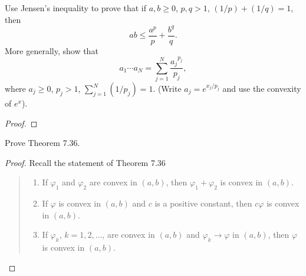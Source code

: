 \begin{problem}
Use Jensen's inequality to prove that if $a,b\geq 0$, $p,q>1$,
$(1/p)+(1/q)=1$, then
\[
ab\leq\frac{a^p}{p}+\frac{b^q}{q}.
\]
More generally, show that
\[
a_1\dotsm a_N=\sum_{j=1}^N\frac{{a_j}^{p_j}}{p_j},
\]
where $a_j\geq 0$, $p_j>1$, $\sum_{j=1}^N(1/p_j)=1$. (Write
$a_j=e^{x_j/p_j}$ and use the convexity of $e^x$).
\end{problem}
\begin{proof}
\end{proof}

\begin{problem}
Prove Theorem 7.36.
\end{problem}
\begin{proof}
Recall the statement of Theorem 7.36
\begin{quote}
\begin{enumerate}[label=\textnormal{(\roman*)},noitemsep]
\item If $\varphi_1$ and $\varphi_2$ are convex in $(a,b)$, then
  $\varphi_1+\varphi_2$ is convex in $(a,b)$.
\item If $\varphi$ is convex in $(a,b)$ and $c$ is a positive constant,
  then $c\varphi$ is convex in $(a,b)$.
\item If $\varphi_k$, $k=1,2,\dotsc$, are convex in $(a,b)$ and
  $\varphi_k\to\varphi$ in $(a,b)$, then $\varphi$ is convex in $(a,b)$.
\end{enumerate}
\end{quote}
\end{proof}

